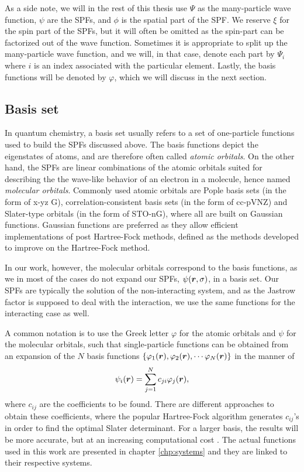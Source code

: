 As a side note, we will in the rest of this thesis use $\Psi$ as the many-particle wave function, $\psi$ are the SPFs, and $\phi$ is the spatial part of the SPF. We reserve $\xi$ for the spin part of the SPFs, but it will often be omitted as the spin-part can be factorized out of the wave function. Sometimes it is appropriate to split up the many-particle wave function, and we will, in that case, denote each part by $\Psi_i$ where $i$ is an index associated with the particular element. Lastly, the basis functions will be denoted by $\varphi$, which we will discuss in the next section.

\subsection{Basis set} \label{sec:basisset}
In quantum chemistry, a basis set usually refers to a set of one-particle functions used to build the SPFs discussed above. The basis functions depict the eigenstates of atoms, and are therefore often called \textit{atomic orbitals}. On the other hand, the SPFs are linear combinations of the atomic orbitals suited for describing the the wave-like behavior of an electron in a molecule, hence named \textit{molecular orbitals}. Commonly used atomic orbitals are Pople basis sets \supercite{ditchfield_self-consistent_1971} (in the form of x-yz G), correlation-consistent basis sets \supercite{dunning_gaussian_1989} (in the form of cc-pVNZ) and Slater-type orbitals \supercite{slater_atomic_1930} (in the form of STO-nG), where all are built on Gaussian functions. Gaussian functions are preferred as they allow efficient implementations of post Hartree-Fock methods, defined as the methods developed to improve on the Hartree-Fock method.

In our work, however, the molecular orbitals correspond to the basis functions, as we in most of the cases do not expand our SPFs, $\psi(\boldsymbol{{r}},\sigma)$, in a basis set. Our SPFs are typically the solution of the non-interacting system, and as the Jastrow factor is supposed to deal with the interaction, we use the same functions for the interacting case as well.

A common notation is to use the Greek letter $\varphi$ for the atomic orbitals and $\psi$ for the molecular orbitals, such that single-particle functions can be obtained from an expansion of the $N$ basis functions $\{\varphi_1(\boldsymbol{{r}}),\varphi_2(\boldsymbol{{r}}),\cdots\varphi_N(\boldsymbol{{r}})\}$ in the manner of
\begin{equation}
\psi_i(\boldsymbol{{r}})=\sum_{j=1}^Nc_{ji}\varphi_j(\boldsymbol{{r}}),
\label{eq:expansion}
\end{equation}
where $c_{ij}$ are the coefficients to be found. There are different approaches to obtain these coefficients, where the popular Hartree-Fock algorithm generates $c_{ij}$'s in order to find the optimal Slater determinant. For a larger basis, the results will be more accurate, but at an increasing computational cost \supercite{daniel_crawford_introduction_2007}. The actual functions used in this work are presented in chapter \ref{chp:systems} and they are linked to their respective systems. 


